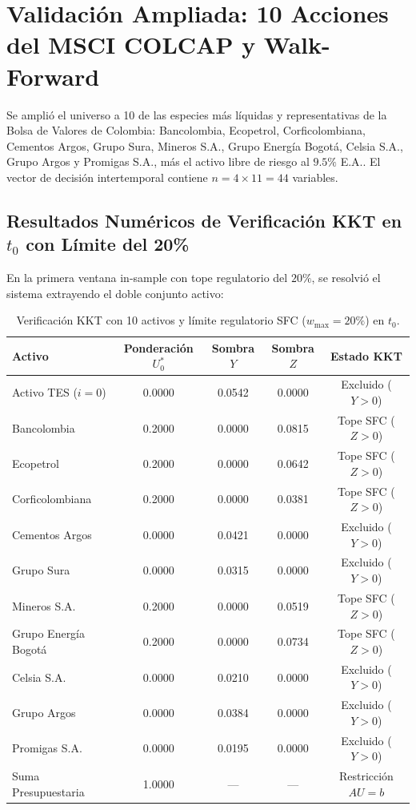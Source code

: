 \documentclass[11pt,a4paper]{article}
\begin{document}
\section{Validación Ampliada: 10 Acciones del MSCI COLCAP y Walk-Forward}

Se amplió el universo a 10 de las especies más líquidas y representativas de la Bolsa de Valores de Colombia: Bancolombia, Ecopetrol, Corficolombiana, Cementos Argos, Grupo Sura, Mineros S.A., Grupo Energía Bogotá, Celsia S.A., Grupo Argos y Promigas S.A., más el activo libre de riesgo al $9.5\%$ E.A.. El vector de decisión intertemporal contiene $n = 4 \times 11 = 44$ variables.

\subsection{Resultados Numéricos de Verificación KKT en \texorpdfstring{$t_0$}{t0} con Límite del 20\%}
En la primera ventana in-sample con tope regulatorio del $20\%$, se resolvió el sistema extrayendo el doble conjunto activo:

\begin{table}[htbp]
\centering
\footnotesize
\setlength{\tabcolsep}{5pt}
\begin{tabular}{lcccc}
\toprule
Activo & Ponderación $U_0^*$ & Sombra $Y$ & Sombra $Z$ & Estado KKT \\
\midrule
Activo TES ($i=0$) & 0.0000 & 0.0542 & 0.0000 & Excluido ($Y > 0$) \\
Bancolombia & 0.2000 & 0.0000 & 0.0815 & Tope SFC ($Z > 0$) \\
Ecopetrol & 0.2000 & 0.0000 & 0.0642 & Tope SFC ($Z > 0$) \\
Corficolombiana & 0.2000 & 0.0000 & 0.0381 & Tope SFC ($Z > 0$) \\
Cementos Argos & 0.0000 & 0.0421 & 0.0000 & Excluido ($Y > 0$) \\
Grupo Sura & 0.0000 & 0.0315 & 0.0000 & Excluido ($Y > 0$) \\
Mineros S.A. & 0.2000 & 0.0000 & 0.0519 & Tope SFC ($Z > 0$) \\
Grupo Energía Bogotá & 0.2000 & 0.0000 & 0.0734 & Tope SFC ($Z > 0$) \\
Celsia S.A. & 0.0000 & 0.0210 & 0.0000 & Excluido ($Y > 0$) \\
Grupo Argos & 0.0000 & 0.0384 & 0.0000 & Excluido ($Y > 0$) \\
Promigas S.A. & 0.0000 & 0.0195 & 0.0000 & Excluido ($Y > 0$) \\
\midrule
Suma Presupuestaria & 1.0000 & --- & --- & Restricción $AU=b$ \\
\bottomrule
\end{tabular}
\caption{Verificación KKT con 10 activos y límite regulatorio SFC ($w_{\max} = 20\%$) en $t_0$.}
\end{table}
\end{document}
